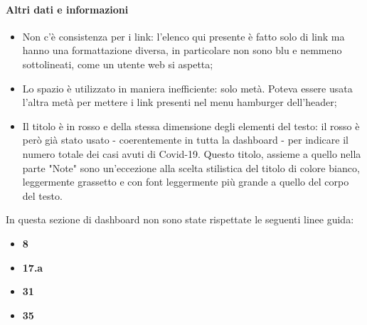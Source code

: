 \paragraph{Altri dati e informazioni}
\begin{itemize}
    \item Non c'è consistenza per i link: l'elenco qui presente è fatto solo di link ma hanno una formattazione diversa, in particolare non sono blu e nemmeno sottolineati, come un utente web si aspetta;
    \item Lo spazio è utilizzato in maniera inefficiente: solo metà. Poteva essere usata l'altra metà per mettere i link presenti nel menu hamburger dell'header;
    \item Il titolo è in rosso e della stessa dimensione degli elementi del testo: il rosso è però già stato usato - coerentemente in tutta la dashboard - per indicare il numero totale dei casi avuti di Covid-19. Questo titolo, assieme a quello nella parte "Note" sono un'eccezione alla scelta stilistica del titolo di colore bianco, leggermente grassetto e con font leggermente più grande a quello del corpo del testo.
\end{itemize}
In questa sezione di dashboard non sono state rispettate le seguenti linee guida:
\begin{itemize}
    \item \textbf{8}
    \item \textbf{17.a}
    \item \textbf{31}
    \item \textbf{35}
\end{itemize}

